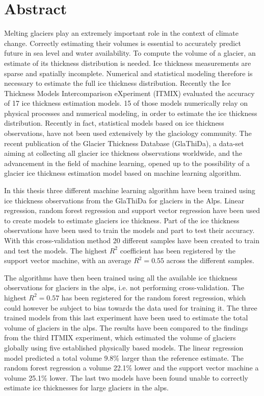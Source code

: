 \chapter*{Abstract}
\thispagestyle{plain}
Melting glaciers play an extremely important role in the context of climate change. Correctly estimating their volumes is essential to accurately predict future in sea level and water availability. To compute the volume of a glacier, an estimate of its thickness distribution is needed. Ice thickness measurements are sparse and spatially incomplete. Numerical and statistical modeling therefore is necessary to estimate the full ice thickness distribution. Recently the Ice Thickness Models Intercomparison eXperiment (ITMIX) evaluated the accuracy of 17 ice thickness estimation models. 15 of those models numerically relay on physical processes and numerical modeling, in order to estimate the ice thickness distribution. Recently in fact, statistical models based on ice thickness observations, have not been used extensively by the glaciology community. The recent publication of the Glacier Thickness Database (GlaThiDa), a data-set aiming at collecting all glacier ice thickness observations worldwide, and the advancement in the field of machine learning, opened up to the possibility of a glacier ice thickness estimation model based on machine learning algorithm.

In this thesis three different machine learning algorithm have been trained using ice thickness observations from the GlaThiDa for glaciers in the Alps. Linear regression, random forest regression and support vector regression have been used to create models to estimate glaciers ice thickness. Part of the ice thickness observations have been used to train the models and part to test their accuracy. With this cross-validation method 20 different samples have been created to train and test the models. The highest $R^2$ coefficient has been registered by the support vector machine, with an average $R^2=0.55$ across the different samples. 

The algorithms have then been trained using all the available ice thickness observations for glaciers in the alps, i.e. not performing cross-validation. The highest $R^2=0.57$ has been registered for the random forest regression, which could however be subject to bias towards the data used for training it. The three trained models from this last experiment have been used to estimate the total volume of glaciers in the alps. The results have been compared to the findings from the third ITMIX experiment, which estimated the volume of glaciers globally using five established physically based models. The linear regression model predicted a total volume 9.8\% larger than the reference estimate. The random forest regression a volume 22.1\% lower and the support vector machine a volume 25.1\% lower. The last two models have been found unable to correctly estimate ice thicknesses for large glaciers in the alps.

